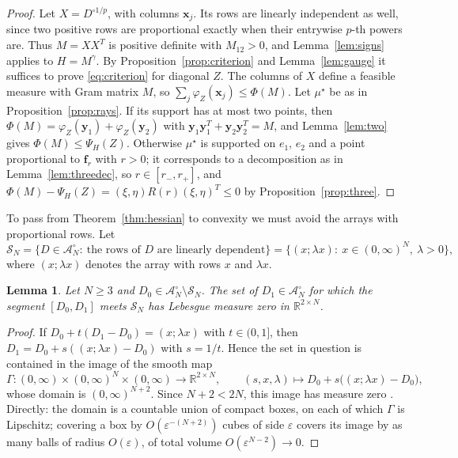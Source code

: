 \documentclass[11pt]{amsart}
\newtheorem{lemma}[theorem]{Lemma}
\theoremstyle{definition}
\theoremstyle{remark}
\numberwithin{equation}{section}
\newcommand{\R}{\mathbb{R}}
\newcommand{\cA}{\mathcal{A}}
\newcommand{\bx}{\mathbf{x}}
\newcommand{\by}{\mathbf{y}}
\newcommand{\bff}{\mathbf{f}}
\begin{document}
\begin{proof}
Let $X=D^{\circ1/p}$, with columns $\bx_j$. Its rows are linearly independent as well, since two positive rows are proportional exactly when their entrywise $p$-th powers are. Thus $M=XX^T$ is positive definite with $M_{12}>0$, and Lemma~\ref{lem:signs} applies to $H=M^\gamma$. By Proposition~\ref{prop:criterion} and Lemma~\ref{lem:gauge} it suffices to prove \eqref{eq:criterion} for diagonal $Z$. The columns of $X$ define a feasible measure with Gram matrix $M$, so $\sum_j\varphi_Z(\bx_j)\le\Phi(M)$. Let $\mu^\star$ be as in Proposition~\ref{prop:rays}. If its support has at most two points, then $\Phi(M)=\varphi_Z(\by_1)+\varphi_Z(\by_2)$ with $\by_1\by_1^T+\by_2\by_2^T=M$, and Lemma~\ref{lem:two} gives $\Phi(M)\le\Psi_H(Z)$. Otherwise $\mu^\star$ is supported on $e_1$, $e_2$ and a point proportional to $\bff_r$ with $r>0$; it corresponds to a decomposition as in Lemma~\ref{lem:threedec}, so $r\in[r_-,r_+]$, and $\Phi(M)-\Psi_H(Z)=(\xi,\eta)R(r)(\xi,\eta)^T\le0$ by Proposition~\ref{prop:three}.
\end{proof}

To pass from Theorem~\ref{thm:hessian} to convexity we must avoid the arrays with proportional rows. Let
\[
\mathcal S_N=\{D\in\cA_N^\circ:\ \text{the rows of }D\text{ are linearly dependent}\}=\{(x;\lambda x):\ x\in(0,\infty)^N,\ \lambda>0\},
\]
where $(x;\lambda x)$ denotes the array with rows $x$ and $\lambda x$.

\begin{lemma}\label{lem:avoid}
Let $N\ge3$ and $D_0\in\cA_N^\circ\setminus\mathcal S_N$. The set of $D_1\in\cA_N^\circ$ for which the segment $[D_0,D_1]$ meets $\mathcal S_N$ has Lebesgue measure zero in $\R^{2\times N}$.
\end{lemma}

\begin{proof}
If $D_0+t(D_1-D_0)=(x;\lambda x)$ with $t\in(0,1]$, then $D_1=D_0+s((x;\lambda x)-D_0)$ with $s=1/t$. Hence the set in question is contained in the image of the smooth map
\[
\Gamma\colon(0,\infty)\times(0,\infty)^N\times(0,\infty)\to\R^{2\times N},\qquad (s,x,\lambda)\mapsto D_0+s\bigl((x;\lambda x)-D_0\bigr),
\]
whose domain is $(0,\infty)^{N+2}$. Since $N+2<2N$, this image has measure zero \cite[Chapter~6]{Lee13}. Directly: the domain is a countable union of compact boxes, on each of which $\Gamma$ is Lipschitz; covering a box by $O(\varepsilon^{-(N+2)})$ cubes of side $\varepsilon$ covers its image by as many balls of radius $O(\varepsilon)$, of total volume $O(\varepsilon^{N-2})\to0$.
\end{proof}
\end{document}
